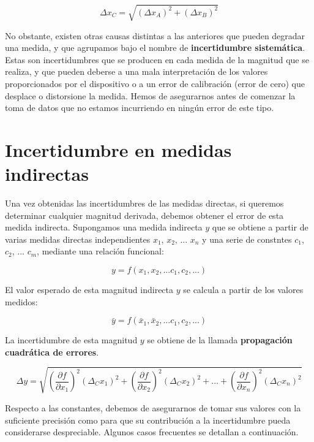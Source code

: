 \documentclass{book}
\begin{document}
\begin{equation}
  \Delta x_C = \sqrt{(\Delta x_A)^2 + (\Delta x_B)^2}
\end{equation}

No obstante, existen otras causas distintas a las anteriores que pueden degradar una medida, y
que agrupamos bajo el nombre de \textbf{incertidumbre sistemática}. Estas son incertidumbres que se producen
en cada medida de la magnitud que se realiza, y que pueden deberse a una mala interpretación de
los valores proporcionados por el dispositivo o a un error de calibración (error de cero) que
desplace o distorsione la medida. Hemos de asegurarnos antes de comenzar la toma de datos que no
estamos incurriendo en ningún error de este tipo.

\section{Incertidumbre en medidas indirectas}

Una vez obtenidas las incertidumbres de las medidas directas, si queremos determinar cualquier
magnitud derivada, debemos obtener el error de esta medida indirecta. Supongamos una medida
indirecta $y$ que se obtiene a partir de varias medidas directas independientes $x_1$, $x_2$, 
... $x_n$  y una serie de constntes $c_1$, $c_2$, ... $c_m$, mediante una relación funcional:

\begin{equation}
  y = f(x_1, x_2, ... c_1, c_2, ...)
\end{equation}

El valor esperado de esta magnitud indirecta $y$ se calcula a partir de los valores medidos:

\begin{equation}
  \bar{y} = f(\bar{x}_1, \bar{x}_2, ... c_1, c_2, ...)
\end{equation}

La incertidumbre de esta magnitud $y$ se obtiene de la llamada \textbf{propagación cuadrática de 
errores}.

\begin{equation}
  \Delta y = \sqrt{ \left( \frac{\partial f}{\partial x_1} \right)^2 (\Delta_C x_1)^2 + 
  \left( \frac{\partial f}{\partial x_2} \right)^2 (\Delta_C x_2)^2 + ... +
  \left( \frac{\partial f}{\partial x_n} \right)^2 (\Delta_C x_n)^2}
\end{equation}

Respecto a las constantes, debemos de asegurarnos de tomar sus valores con la suficiente precisión
como para que su contribución a la incertidumbre pueda considerarse despreciable. Algunos casos
frecuentes se detallan a continuación.
\end{document}
